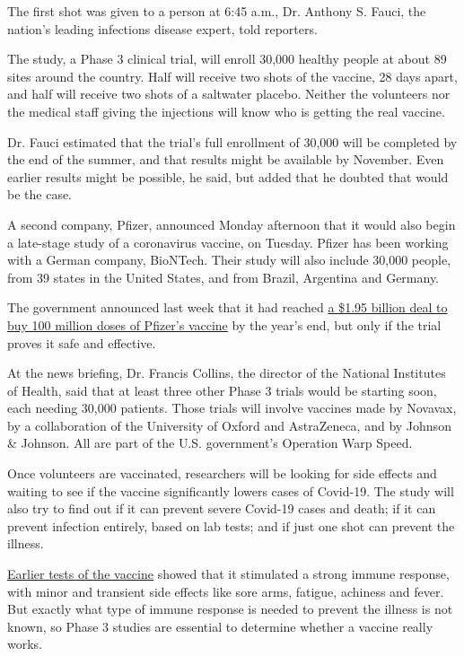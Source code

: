 The first shot was given to a person at 6:45 a.m., Dr. Anthony S. Fauci,
the nation's leading infections disease expert, told reporters.

The study, a Phase 3 clinical trial, will enroll 30,000 healthy people
at about 89 sites around the country. Half will receive two shots of the
vaccine, 28 days apart, and half will receive two shots of a saltwater
placebo. Neither the volunteers nor the medical staff giving the
injections will know who is getting the real vaccine.

Dr. Fauci estimated that the trial's full enrollment of 30,000 will be
completed by the end of the summer, and that results might be available
by November. Even earlier results might be possible, he said, but added
that he doubted that would be the case.

A second company, Pfizer, announced Monday afternoon that it would also
begin a late-stage study of a coronavirus vaccine, on Tuesday. Pfizer
has been working with a German company, BioNTech. Their study will also
include 30,000 people, from 39 states in the United States, and from
Brazil, Argentina and Germany.

The government announced last week that it had reached
\href{https://www.nytimes3xbfgragh.onion/2020/07/22/us/politics/pfizer-coronavirus-vaccine.html}{a
\$1.95 billion deal to buy 100 million doses of Pfizer's vaccine} by the
year's end, but only if the trial proves it safe and effective.

At the news briefing, Dr. Francis Collins, the director of the National
Institutes of Health, said that at least three other Phase 3 trials
would be starting soon, each needing 30,000 patients. Those trials will
involve vaccines made by Novavax, by a collaboration of the University
of Oxford and AstraZeneca, and by Johnson \& Johnson. All are part of
the U.S. government's Operation Warp Speed.

Once volunteers are vaccinated, researchers will be looking for side
effects and waiting to see if the vaccine significantly lowers cases of
Covid-19. The study will also try to find out if it can prevent severe
Covid-19 cases and death; if it can prevent infection entirely, based on
lab tests; and if just one shot can prevent the illness.

\href{https://slack-redir.net/link?url=https\%3A\%2F\%2Fwww.nytimes3xbfgragh.onion\%2F2020\%2F07\%2F14\%2Fhealth\%2Fcornavirus-vaccine-moderna.html\%3FsearchResultPosition\%3D5}{Earlier
tests of the vaccine} showed that it stimulated a strong immune
response, with minor and transient side effects like sore arms, fatigue,
achiness and fever. But exactly what type of immune response is needed
to prevent the illness is not known, so Phase 3 studies are essential to
determine whether a vaccine really works.

